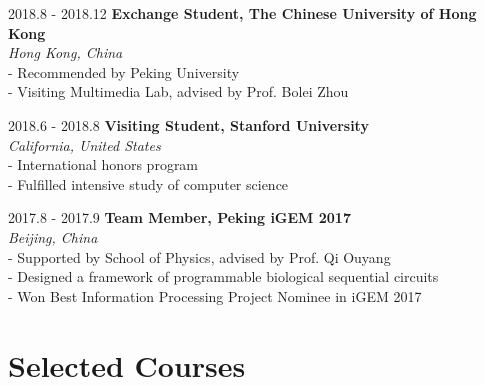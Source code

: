 \documentclass{academiccv}
\begin{document}
\begin{tablist}

\item[2018.8 - 2018.12] 	\tab \textbf {Exchange Student, The Chinese University of Hong Kong} \textbf
					\\ \tab \emph{Hong Kong, China}\emph
					\\ \tab - Recommended by Peking University
				      \\ \tab - Visiting Multimedia Lab, advised by Prof. Bolei Zhou
				   

\item[2018.6 - 2018.8] 	\tab \textbf {Visiting Student, Stanford University} \textbf
					\\ \tab \emph{California, United States}\emph
				      \\ \tab - International honors program
				     \\ \tab - Fulfilled intensive study of computer science
				     
\item[2017.8 - 2017.9] 	\tab \textbf {Team Member, Peking iGEM 2017} \textbf
					\\ \tab \emph{Beijing, China}\emph
					\\ \tab - Supported by School of Physics, advised by Prof. Qi Ouyang
				      \\ \tab - Designed a framework of programmable biological sequential circuits
				     \\ \tab - Won Best Information Processing Project Nominee in iGEM 2017		   
				     
				     
				     
				     				      
\end{tablist}

\section*{Selected Courses}
\end{document}
